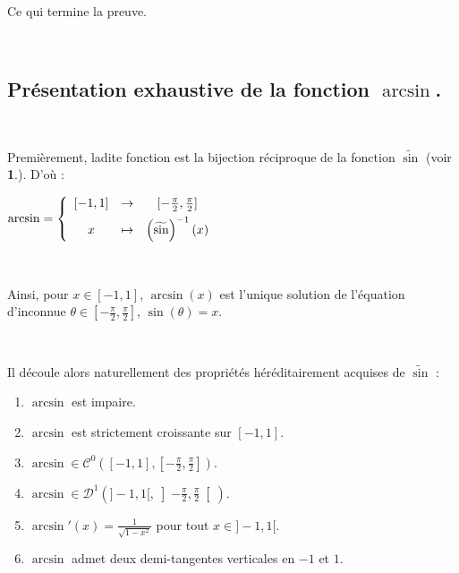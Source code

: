 \documentclass{article}
\begin{document}
\

Ce qui termine la preuve.

\

\subsection{Présentation exhaustive de la fonction $\arcsin$.} 

\

Premièrement, ladite fonction est la bijection réciproque de la fonction $\widetilde{\sin}$ (voir \textbf{1}.). D'où : 
\begin{center}

$\arcsin = \left\{  
\begin{array}{c c c}
[-1,1] & \to & [-\frac{\pi}{2} , \frac{\pi}{2}] \\ [1ex]
x & \mapsto & \left( \widetilde{\sin} \right)^{-1}(x)
\end{array} 
\right.
$
\end{center}

\

Ainsi, pour $x\in [-1,1]$, $\arcsin (x)$ est l'unique solution de l'équation d'inconnue $\theta \in \textstyle \left[-\frac{\pi}{2} , \frac{\pi}{2}\right]$, $\sin(\theta) = x$. 

\

Il découle alors naturellement des propriétés héréditairement acquises de $\widetilde{\sin}$ : 

\begin{enumerate}
    \item $\arcsin$ est impaire.
    \item $\arcsin$ est strictement croissante sur $[-1,1]$.
    \item $\arcsin \in \mathcal{C}^0\left([-1,1],[-\frac{\pi}{2} , \frac{\pi}{2}] \right)$.
    \item $\arcsin \in \mathcal{D}^1\left(]-1,1[,\left]-\frac{\pi}{2} , \frac{\pi}{2}\right[ \right)$.
    \item $\arcsin'(x) = \frac{1}{\sqrt{1-x^2}}$ pour tout $x\in]-1,1[$.
    \item $\arcsin$ admet deux demi-tangentes verticales en $-1$ et $1$.
\end{enumerate}

\
\end{document}
